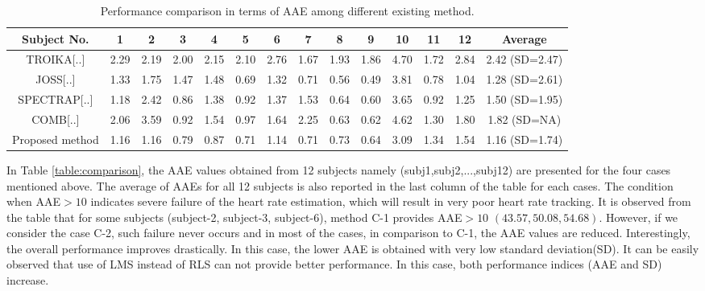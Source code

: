 \documentclass[final,3p,times,authoryear]{elsarticle}
\begin{document}
\begin{table*}[t]
  \centering
  \caption{Performance comparison in terms of AAE among different existing method.}
  \label{table:comparison_paper}
  \begin{tabular}{c|c|c|c|c|c|c|c|c|c|c|c|c|c}
  
    
    \hline
    Subject No. & 1 & 2 & 3 & 4 & 5 & 6 & 7 & 8 & 9 & 10 & 11 & 12 & Average\\
    
    \hline
    
    TROIKA[..]  & 2.29 & 2.19 & 2.00 & 2.15 & 2.10 & 2.76 & 1.67 & 1.93 & 1.86 & 4.70 & 1.72 & 2.84  & 2.42 (SD=2.47)\\    
    \hline
    
    JOSS[..]   &  1.33 & 1.75 & 1.47 & 1.48 & 0.69 & 1.32 & 0.71 & 0.56 & 0.49 & 3.81 & 0.78 & 1.04 & 1.28 (SD=2.61)\\
    \hline
    SPECTRAP[..] & 1.18 & 2.42 & 0.86 & 1.38 & 0.92 & 1.37 & 1.53 & 0.64 & 0.60 & 3.65 & 0.92 & 1.25 & 1.50 (SD=1.95)\\
	\hline
	
	COMB[..] & 2.06 & 3.59 & 0.92 & 1.54 & 0.97 & 1.64 & 2.25 & 0.63 & 0.62 & 4.62 & 1.30 & 1.80 & 1.82 (SD=NA)\\
    \hline
    Proposed method   &     1.16  &  1.16  &  0.79  &  0.87    & 0.71  &  1.14  &  0.71  &  0.73  &  0.64  &  3.09   & 1.34  &  1.54 & 1.16 (SD=1.74)\\
    \hline
  \end{tabular}
  
\end{table*} 

In Table \ref{table:comparison}, the AAE values obtained from 12 subjects namely (subj1,subj2,...,subj12) are presented for the four cases mentioned above. The average of AAEs for all 12 subjects is also reported in the last column of the table for each cases. The condition when AAE$>10$ indicates severe failure of the heart rate estimation, which will result in very poor heart rate tracking. It is observed from the table that for some subjects (subject-2, subject-3, subject-6), method C-1 provides AAE$>10$ $(43.57,50.08,54.68)$. However, if we consider the case C-2, such failure never occurs and in most of the cases, in comparison to C-1, the AAE values are reduced. Interestingly, the overall performance improves drastically. In this case, the lower AAE is obtained with very low standard deviation(SD). It can be easily observed that use of LMS instead of RLS can not provide better performance. In this case, both performance indices (AAE and SD) increase.  \\
\end{document}
